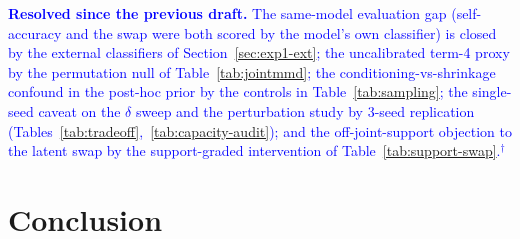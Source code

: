 \documentclass[10pt,letterpaper]{article}
\newcommand{\pj}[1]{\textcolor{blue}{#1$^{\dagger}$}}
\begin{document}
\pj{\textbf{Resolved since the previous draft.} The same-model evaluation
gap (self-accuracy and the swap were both scored by the model's own
classifier) is closed by the external classifiers of
Section~\ref{sec:exp1-ext}; the uncalibrated term-4 proxy by the permutation
null of Table~\ref{tab:jointmmd}; the conditioning-vs-shrinkage confound in
the post-hoc prior by the controls in Table~\ref{tab:sampling}; the
single-seed caveat on the $\delta$ sweep and the perturbation study by
3-seed replication (Tables~\ref{tab:tradeoff},~\ref{tab:capacity-audit});
and the off-joint-support objection to the latent swap by the
support-graded intervention of Table~\ref{tab:support-swap}.}

\section{Conclusion}
\end{document}
